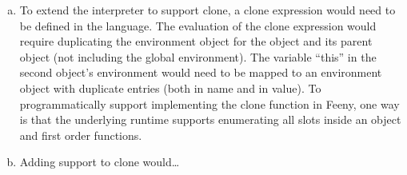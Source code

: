 \documentclass[notitlepage]{report}
\begin{document}
\begin{enumerate}
\begin{enumerate}[(a)]
			\item To extend the interpreter to support clone, a clone expression would need to be defined in the language.  The evaluation of the clone expression would require duplicating the environment object for the object and its parent object (not including the global environment).  The variable ``this'' in the second object's environment would need to be mapped to an environment object with duplicate entries (both in name and in value). To programmatically support implementing the clone function in Feeny, one way is that the underlying runtime supports enumerating all slots inside an object and first order functions.
			\item Adding support to clone would\dots
		\end{enumerate}
\end{enumerate}
\end{document}
